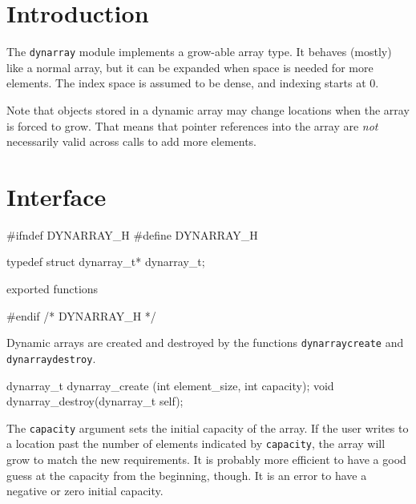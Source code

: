 
\section{Introduction}

The {\tt{}dynarray} module implements a grow-able array type.
It behaves (mostly) like a normal array, but it can be expanded
when space is needed for more elements.  The index space is
assumed to be dense, and indexing starts at 0.

Note that objects stored in a dynamic array may change locations
when the array is forced to grow.  That means that pointer references
into the array are \emph{not} necessarily valid across calls to add
more elements.


\section{Interface}

\endmoddef
#ifndef DYNARRAY_H
#define DYNARRAY_H

typedef struct dynarray_t* dynarray_t;

\LA{}exported functions~{\nwtagstyle{}}\RA{}

#endif /* DYNARRAY_H */
\nwendcode{}\nwdocspar

Dynamic arrays are created and destroyed by the functions
{\tt{}dynarray{}create} and {\tt{}dynarray{}destroy}.

\nwenddocs{}\endmoddef
dynarray_t dynarray_create (int element_size, int capacity);
void       dynarray_destroy(dynarray_t self);

\nwendcode{}\nwdocspar

The {\tt{}capacity} argument sets the initial capacity of the
array.  If the user writes to a location past the number
of elements indicated by {\tt{}capacity}, the array will grow
to match the new requirements.  It is probably more efficient
to have a good guess at the capacity from the beginning, though.
It is an error to have a negative or zero initial capacity.

